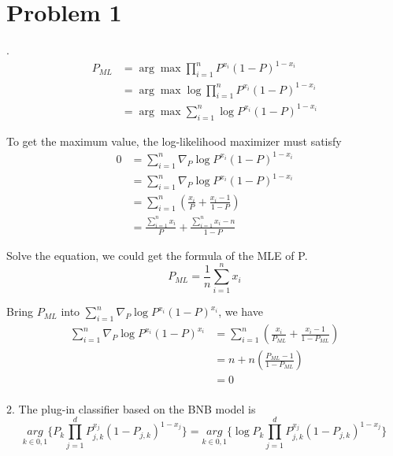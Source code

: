 \documentclass[twoside,11pt]{homework}
\begin{document}
\maketitle

\section*{Problem 1}
.  
\begin{align*}
 P_{ML} &= \arg\max\prod_{i=1}^nP^{x_{i}}(1-P)^{1-x_{i}}\\
&= \arg\max\log{\prod_{i=1}^nP^{x_{i}}(1-P)^{1-x_{i}}}\\
&= \arg\max\sum_{i=1}^n\log{P^{x_{i}}(1-P)^{1-x_{i}}}
\end{align*}

To get the maximum value, the log-likelihood maximizer must satisfy\\



\begin{align*}
0 &= \sum_{i=1}^n\nabla_P\log{P^{x_{i}}(1-P)^{1-x_{i}}} \\
&= \sum_{i=1}^n\nabla_P\log{P^{x_{i}}(1-P)^{1-x_{i}}} \\
&= \sum_{i=1}^n( \frac{x_{i}}{P} + \frac{x_{i} - 1}{1 - P})\\
&= \frac{\sum_{i=1}^nx_{i}}{P} + \frac{\sum_{i=1}^nx_{i} - n}{1-P}
\end{align*}

Solve the equation, we could get the formula of the MLE of P. 
\begin{equation}
P_{ML} =  \frac{1}{n}{\sum_{i=1}^n x_{i}}
\end{equation}



Bring $P_{ML}$ into $\sum_{i=1}^n\nabla_P\log{P^{x_{i}}(1-P)^{x_{i}}} $, we have \\
\begin{align*}
\sum_{i=1}^n\nabla_P\log{P^{x_{i}}(1-P)^{x_{i}}} &=\sum_{i=1}^n( \frac{x_{i}}{P_{ML}} + \frac{x_{i} - 1}{1 - P_{ML}}) \\
&= n + n(\frac{P_{ML} - 1}{1 - P_{ML}})\\
&= 0
\end{align*}\\


2. 
The plug-in classifier based on the BNB model is
\begin{equation}
\underset {k \in {0, 1}}{arg}\{P_k \prod_{j=1}^dP_{j,k}^{x_{j}}(1-P_{j,k})^{1-x_{j}}\} =
\underset {k \in {0, 1}}{arg}\{\log{P_k \prod_{j=1}^dP_{j,k}^{x_{j}}(1-P_{j,k})^{1-x_{j}}}\}
\end{equation}
\end{document}
